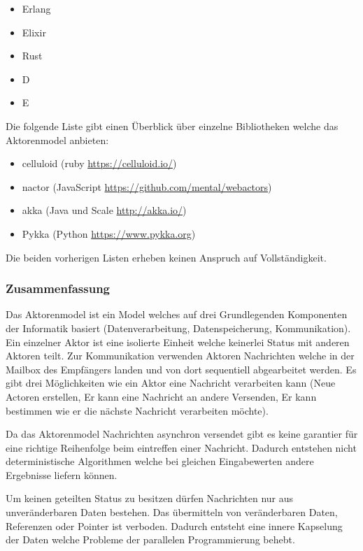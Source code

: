 \begin{itemize}
  \item Erlang
  \item Elixir
  \item Rust
  \item D
  \item E
\end{itemize}

Die folgende Liste gibt einen Überblick über einzelne Bibliotheken welche das Aktorenmodel anbieten:

\begin{itemize}
  \item celluloid (ruby \url{https://celluloid.io/})
  \item nactor (JavaScript \url{https://github.com/mental/webactors})
  \item akka (Java und Scale \url{http://akka.io/})
  \item Pykka (Python \url{https://www.pykka.org})
\end{itemize}

Die beiden vorherigen Listen erheben keinen Anspruch auf Vollständigkeit. 


\subsubsection{Zusammenfassung}
Das Aktorenmodel ist ein Model welches auf drei Grundlegenden Komponenten der Informatik basiert (Datenverarbeitung, Datenspeicherung, Kommunikation). Ein einzelner Aktor ist eine isolierte Einheit welche keinerlei Status mit anderen Aktoren teilt. Zur Kommunikation verwenden Aktoren Nachrichten welche in der Mailbox des Empfängers landen und von dort sequentiell abgearbeitet werden. Es gibt drei Möglichkeiten wie ein Aktor eine Nachricht verarbeiten kann (Neue Actoren erstellen, Er kann eine Nachricht an andere Versenden, Er kann bestimmen wie er die nächste Nachricht verarbeiten möchte).

Da das Aktorenmodel Nachrichten asynchron versendet gibt es keine garantier für eine richtige Reihenfolge beim eintreffen einer Nachricht. Dadurch entstehen nicht deterministische Algorithmen welche bei gleichen Eingabewerten andere Ergebnisse liefern können.

Um keinen geteilten Status zu besitzen dürfen Nachrichten nur aus unveränderbaren Daten bestehen. Das übermitteln von veränderbaren Daten, Referenzen oder Pointer ist verboden. Dadurch entsteht eine innere Kapselung der Daten welche Probleme der parallelen Programmierung behebt.